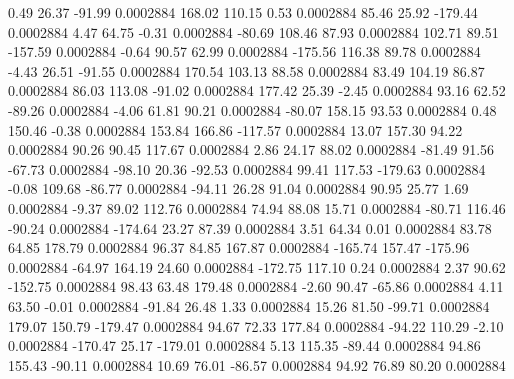         0.49       26.37      -91.99     0.0002884
      168.02      110.15        0.53     0.0002884
       85.46       25.92     -179.44     0.0002884
        4.47       64.75       -0.31     0.0002884
      -80.69      108.46       87.93     0.0002884
      102.71       89.51     -157.59     0.0002884
       -0.64       90.57       62.99     0.0002884
     -175.56      116.38       89.78     0.0002884
       -4.43       26.51      -91.55     0.0002884
      170.54      103.13       88.58     0.0002884
       83.49      104.19       86.87     0.0002884
       86.03      113.08      -91.02     0.0002884
      177.42       25.39       -2.45     0.0002884
       93.16       62.52      -89.26     0.0002884
       -4.06       61.81       90.21     0.0002884
      -80.07      158.15       93.53     0.0002884
        0.48      150.46       -0.38     0.0002884
      153.84      166.86     -117.57     0.0002884
       13.07      157.30       94.22     0.0002884
       90.26       90.45      117.67     0.0002884
        2.86       24.17       88.02     0.0002884
      -81.49       91.56      -67.73     0.0002884
      -98.10       20.36      -92.53     0.0002884
       99.41      117.53     -179.63     0.0002884
       -0.08      109.68      -86.77     0.0002884
      -94.11       26.28       91.04     0.0002884
       90.95       25.77        1.69     0.0002884
       -9.37       89.02      112.76     0.0002884
       74.94       88.08       15.71     0.0002884
      -80.71      116.46      -90.24     0.0002884
     -174.64       23.27       87.39     0.0002884
        3.51       64.34        0.01     0.0002884
       83.78       64.85      178.79     0.0002884
       96.37       84.85      167.87     0.0002884
     -165.74      157.47     -175.96     0.0002884
      -64.97      164.19       24.60     0.0002884
     -172.75      117.10        0.24     0.0002884
        2.37       90.62     -152.75     0.0002884
       98.43       63.48      179.48     0.0002884
       -2.60       90.47      -65.86     0.0002884
        4.11       63.50       -0.01     0.0002884
      -91.84       26.48        1.33     0.0002884
       15.26       81.50      -99.71     0.0002884
      179.07      150.79     -179.47     0.0002884
       94.67       72.33      177.84     0.0002884
      -94.22      110.29       -2.10     0.0002884
     -170.47       25.17     -179.01     0.0002884
        5.13      115.35      -89.44     0.0002884
       94.86      155.43      -90.11     0.0002884
       10.69       76.01      -86.57     0.0002884
       94.92       76.89       80.20     0.0002884
